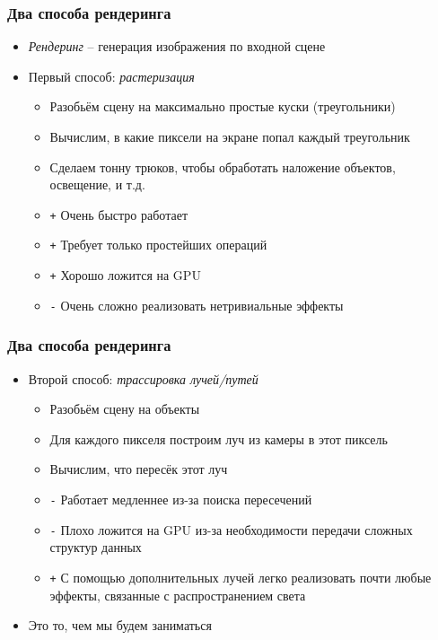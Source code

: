 \documentclass[10pt]{beamer}
\begin{document}
\begin{frame}
\frametitle{Два способа рендеринга}
\begin{itemize}
\item \textit{Рендеринг} -- генерация изображения по входной сцене
\pause
\item Первый способ: \textit{растеризация}
\pause
\begin{itemize}
\item Разобьём сцену на максимально простые куски (треугольники)
\item Вычислим, в какие пиксели на экране попал каждый треугольник
\item Сделаем тонну трюков, чтобы обработать наложение объектов, освещение, и т.д.
\item {\color{green}\texttt{+}} Очень быстро работает
\item {\color{green}\texttt{+}} Требует только простейших операций
\item {\color{green}\texttt{+}} Хорошо ложится на GPU
\item {\color{red}\texttt{-}} Очень сложно реализовать нетривиальные эффекты
\end{itemize}
\end{itemize}
\end{frame}

\begin{frame}
\frametitle{Два способа рендеринга}
\begin{itemize}
\item Второй способ: \textit{трассировка лучей/путей}
\pause
\begin{itemize}
\item Разобьём сцену на объекты
\item Для каждого пикселя построим луч из камеры в этот пиксель
\item Вычислим, что пересёк этот луч
\item {\color{red}\texttt{-}} Работает медленнее из-за поиска пересечений
\item {\color{red}\texttt{-}} Плохо ложится на GPU из-за необходимости передачи сложных структур данных
\item {\color{green}\texttt{+}} С помощью дополнительных лучей легко реализовать почти любые эффекты, связанные с распространением света
\end{itemize}
\pause
\item Это то, чем мы будем заниматься
\end{itemize}
\end{frame}
\end{document}
